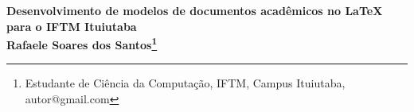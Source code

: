 \begin{center}
\textbf{Desenvolvimento de modelos de documentos acadêmicos no LaTeX para o IFTM Ituiutaba\\
Rafaele Soares dos Santos\footnote[1]{Estudante de Ciência da Computação, IFTM, Campus Ituiutaba, autor@gmail.com}}
\end{center}